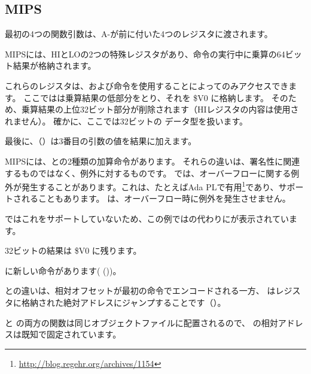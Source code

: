 \subsection{MIPS}



最初の4つの関数引数は、A-が前に付いた4つのレジスタに渡されます。


MIPSには、HIとLOの2つの特殊レジスタがあり、命令の実行中に乗算の64ビット結果が格納されます。


これらのレジスタは、および命令を使用することによってのみアクセスできます。
ここではは乗算結果の低部分をとり、それを \$V0 に格納します。
そのため、乗算結果の上位32ビット部分が削除されます（HIレジスタの内容は使用されません）。
確かに、ここでは32ビットの \Tint データ型を扱います。


最後に、（）は3番目の引数の値を結果に加えます。


MIPSには、との2種類の加算命令があります。
それらの違いは、署名性に関連するものではなく、例外に対するものです。 では、オーバーフローに関する例外が発生することがあります。これは、たとえばAda \ac{PL}で有用\footnote{\url{http://blog.regehr.org/archives/1154}}であり、サポートされることもあります。 
は、オーバーフロー時に例外を発生させません。

\CCpp ではこれをサポートしていないため、この例ではの代わりにが表示されています。

32ビットの結果は \$V0 に残ります。


\main に新しい命令があります( ())。

との違いは、相対オフセットが最初の命令でエンコードされる一方、
はレジスタに格納された絶対アドレスにジャンプすることです（）。

\ttf と \main の両方の関数は同じオブジェクトファイルに配置されるので、 
\ttf の相対アドレスは既知で固定されています。
